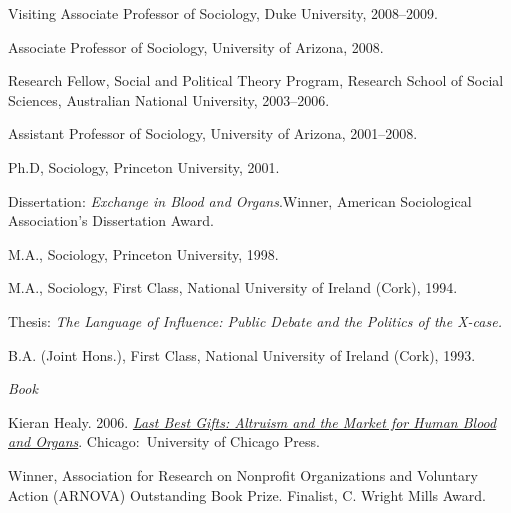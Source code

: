 \documentclass[11pt,article,oneside]{memoir}
\begin{document}
\ind Visiting Associate Professor of Sociology, Duke University, 2008--2009.

\ind Associate Professor of Sociology, University of Arizona, 2008.

\ind Research Fellow, Social and Political Theory Program,
Research School of Social Sciences, Australian National University, 2003--2006.

\ind Assistant Professor of Sociology, University of Arizona, 2001--2008.

\bigskip




\ind Ph.D, Sociology, Princeton University, 2001.

\ind \hspace{0.35in} \footnotesize Dissertation: \emph{Exchange in Blood and Organs}.\newline Winner, American Sociological Association's Dissertation Award.\normalsize \vspace{0.05in}

\ind M.A., Sociology, Princeton University, 1998. 


\ind M.A., Sociology, First Class, National University of Ireland (Cork), 1994.

\ind \hspace{0.35in} \footnotesize Thesis: \emph{The Language of Influence: Public Debate and the Politics of the X-case.} \normalsize \vspace{0.01in}

\ind B.A. (Joint Hons.), First Class, National University of Ireland (Cork), 1993.

\bigskip
 
\medskip
\noindent\emph{Book \vspace{0.01in}}

\ind  Kieran Healy. 2006. \emph{\href{http://www.lastbestgifts.com}{Last Best Gifts: Altruism and the Market for Human Blood and Organs}}. Chicago:~University of Chicago Press. \vspace{0.05in}

\ind \hspace{0.35in} \footnotesize Winner, Association for Research on Nonprofit Organizations and Voluntary Action (ARNOVA) Outstanding Book Prize. Finalist, C. Wright Mills Award. 
\end{document}
